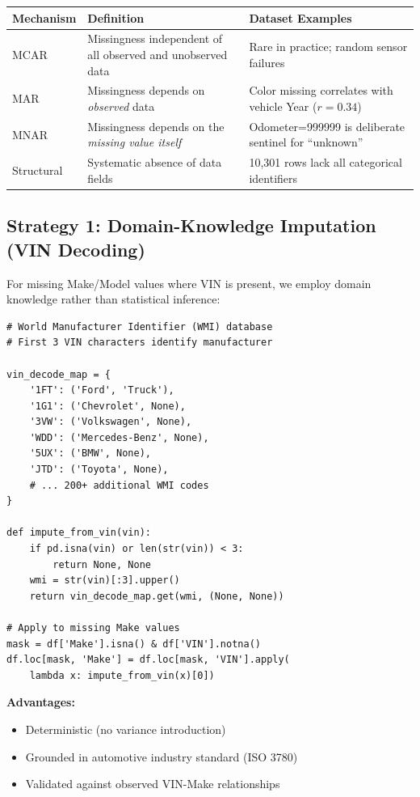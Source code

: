 \documentclass[12pt,a4paper]{article}
\begin{document}
\begin{center}
\begin{tabular}{p{2.5cm}p{5cm}p{6cm}}
\toprule
\textbf{Mechanism} & \textbf{Definition} & \textbf{Dataset Examples} \\
\midrule
MCAR & Missingness independent of all observed and unobserved data & Rare in practice; random sensor failures \\
MAR & Missingness depends on \textit{observed} data & Color missing correlates with vehicle Year ($r=0.34$) \\
MNAR & Missingness depends on the \textit{missing value itself} & Odometer=999999 is deliberate sentinel for ``unknown'' \\
Structural & Systematic absence of data fields & 10,301 rows lack all categorical identifiers \\
\bottomrule
\end{tabular}
\end{center}

\subsection{Strategy 1: Domain-Knowledge Imputation (VIN Decoding)}

For missing Make/Model values where VIN is present, we employ domain knowledge rather than statistical inference:

\begin{lstlisting}
# World Manufacturer Identifier (WMI) database
# First 3 VIN characters identify manufacturer

vin_decode_map = {
    '1FT': ('Ford', 'Truck'),
    '1G1': ('Chevrolet', None),
    '3VW': ('Volkswagen', None),
    'WDD': ('Mercedes-Benz', None),
    '5UX': ('BMW', None),
    'JTD': ('Toyota', None),
    # ... 200+ additional WMI codes
}

def impute_from_vin(vin):
    if pd.isna(vin) or len(str(vin)) < 3:
        return None, None
    wmi = str(vin)[:3].upper()
    return vin_decode_map.get(wmi, (None, None))

# Apply to missing Make values
mask = df['Make'].isna() & df['VIN'].notna()
df.loc[mask, 'Make'] = df.loc[mask, 'VIN'].apply(
    lambda x: impute_from_vin(x)[0])
\end{lstlisting}

\textbf{Advantages:}
\begin{itemize}
    \item Deterministic (no variance introduction)
    \item Grounded in automotive industry standard (ISO 3780)
    \item Validated against observed VIN-Make relationships
\end{itemize}
\end{document}

